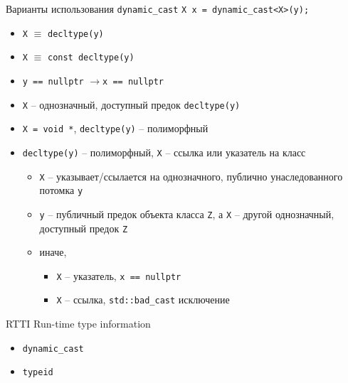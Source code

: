 \documentclass[unknownkeysallowed,xcolor=table]{beamer}
\newcommand{\rarr}{$\rightarrow$}
\begin{document}
\begin{frame}[fragile]{Варианты использования \lstinline{dynamic_cast}}
  \lstinline{X x = dynamic_cast<X>(y);}

  \vspace{1em}

  \begin{itemize}
    \item \lstinline{X} $\equiv$ \lstinline{decltype(y)}
    \item \lstinline{X} $\equiv$ \lstinline{const decltype(y)}
    \item \lstinline{y == nullptr} \rarr \lstinline{x == nullptr}
    \item \lstinline{X} -- однозначный, доступный предок \lstinline{decltype(y)}
    \item \lstinline{X = void *}, \lstinline{decltype(y)} -- полиморфный
    \item \lstinline{decltype(y)} -- полиморфный, \lstinline{X} -- ссылка или указатель на класс
      \begin{itemize}
        \item \lstinline{X} -- указывает/ссылается на однозначного, публично унаследованного потомка \lstinline{y}
        \item \lstinline{y} -- публичный предок объекта класса \lstinline{Z}, а \lstinline{X} -- другой однозначный, доступный предок \lstinline{Z}
        \item иначе,
          \begin{itemize}
            \item \lstinline{X} -- указатель, \lstinline{x == nullptr}
            \item \lstinline{X} -- ссылка, \lstinline{std::bad_cast} исключение
          \end{itemize}
      \end{itemize}
  \end{itemize}
\end{frame}

\begin{frame}[fragile]{RTTI}
  Run-time type information

  \vspace{2em}

  \begin{itemize}
    \item \lstinline{dynamic_cast} \vspace{1em}
    \item \lstinline{typeid}
  \end{itemize}
\end{frame}
\end{document}
